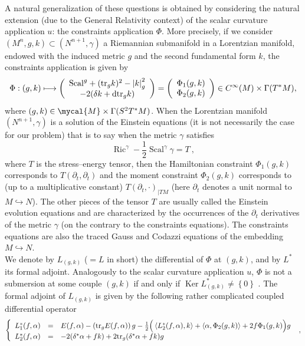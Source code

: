 \documentclass[a4paper,11pt,leqno]{amsart}
\numberwithin{equation}{section}
\theoremstyle{main}
\begin{document}
A natural generalization of these questions is obtained by considering the natural extension (due to the General Relativity context) of the scalar curvature application $u$: the constraints application $\Phi$. More precisely, if we consider $(M^n,g,k)\subset (N^{n+1},\gamma)$ a Riemannian submanifold in a Lorentzian manifold, endowed with the induced metric $g$ and the second fundamental form $k$, the constraints application is given by
$$\Phi:(g,k)\longmapsto \left(
\begin{array}{c}
	{\operatorname{Scal}}^g + ({ {\rm tr}}_g k)^2 - \left|k\right|^2_g \\
	-2(\delta k + {{\rm d}} { {\rm tr}}_g k)
\end{array}
\right)= \left(
\begin{array}{c}
	\Phi_1 (g,k) \\
	\Phi_2 (g,k)
\end{array}
\right) \in C^\infty(M)\times\Gamma(T^* M) ,$$
where $(g,k)\in \mycal{M}\times \Gamma(S^2T^* M)$. When the Lorentzian manifold $(N^{n+1},\gamma)$ is a solution of the Einstein equations (it is not necessarily the case for our problem) that is to say when the metric $\gamma$ satisfies $${\operatorname{Ric}}^\gamma -\frac{1}{2}{\operatorname{Scal}}^\gamma \gamma=T\ ,$$
where $T$ is the stress--energy tensor, then the Hamiltonian constraint $\Phi_1(g,k)$ corresponds to $T(\partial_t,\partial_t)$ and the moment constraint $\Phi_2(g,k)$ corresponds to (up to a multiplicative constant) $T(\partial_t,\cdot)_{|TM}$ (here $\partial_t$ denotes a unit normal to $M\hookrightarrow N$). The other pieces  of the tensor $T$ are usually called the Einstein evolution equations and are characterized by the occurrences of the $\partial_t$ derivatives of the metric $\gamma$ (on the contrary to the constraints equations). The constraints equations are also the traced Gauss and Codazzi equations of the embedding $M\hookrightarrow N$.\\
We denote by $L_{(g,k)}$ ($=L$ in short) the differential of $\Phi$ at $(g,k)$, and by $L^*$ its formal adjoint. Analogously to the scalar curvature application $u$, $\Phi$ is not a submersion at some couple $(g,k)$ if and only if ${\operatorname{Ker}} L^*_{(g,k)}\neq\left\{0\right\}$ . The formal adjoint of $L_{(g,k)}$ is given by the following rather complicated coupled differential operator 
$$\left\{
\begin{array}{lll}
	L_1^* (f,\alpha) & = & E(f,\alpha) - \left({ {\rm tr}}_g E(f,\alpha)\right)g - \frac{1}{2}\Big(\left\langle L_2^* (f,\alpha), k\right\rangle  + \left\langle \alpha, \Phi_2 (g,k)\right\rangle + 2f\Phi_1 (g,k)  \Big)g    \\
	L_2^* (f,\alpha) & = &  -2(\delta^* \alpha +fk) +2 { {\rm tr}}_g(\delta^* \alpha +fk) g
\end{array}\right. \ , $$
\end{document}
